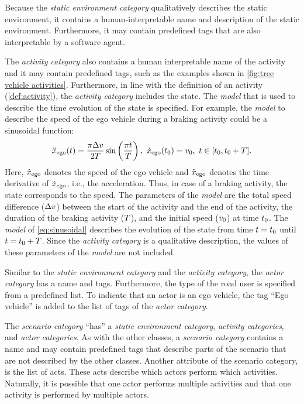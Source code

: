 \cbstartc
Because the \textit{static environment category} qualitatively describes the static environment, it contains a human-interpretable name and description of the static environment. Furthermore, it may contain predefined tags that are also interpretable by a software agent.
\cbend

\cbstart
The \textit{activity category} also contains a human interpretable name of the activity and it may contain predefined tags, such as the examples shown in \cref{fig:tree vehicle activities}. Furthermore, in line with the definition of an activity (\cref{def:activity}), the \textit{activity category} includes the state.
The \textit{model} that is used to describe the time evolution of the state is specified. For example, the \textit{model} to describe the speed of the ego vehicle during a braking activity could be a sinusoidal function:
\cbstartc
\begin{equation} \label{eq:sinusoidal}
	\ddot{x}_{\mathrm{ego}}(t) = \frac{\pi \Delta v}{2T} \sin \left( \frac{\pi t}{T} \right),\ \dot{x}_{\mathrm{ego}}(t_{0}) = v_{0},\ t \in [t_{0}, t_{0}+T].
\end{equation}
Here, $\dot{x}_{\mathrm{ego}}$ denotes the speed of the ego vehicle and $\ddot{x}_{\mathrm{ego}}$ denotes the time derivative of $\dot{x}_{\mathrm{ego}}$, i.e., the acceleration. Thus, in case of a braking activity, the state corresponds to the speed. 
The parameters of the \textit{model} are the total speed difference ($\Delta v$) between the start of the activity and the end of the activity, the duration of the braking activity ($T$), and the initial speed ($v_{0}$) at time $t_{0}$. 
\cbstart
The \textit{model} of \cref{eq:sinusoidal} describes the evolution of the state from time $t=t_{0}$ until $t=t_{0}+T$. Since the \textit{activity category} is a qualitative description, the values of these parameters of the \textit{model} are not included.
\cbend

Similar to the \textit{static environment category} and the \textit{activity category}, the \textit{actor category} has a name and tags. Furthermore, the type of the road user is specified from a predefined list. To indicate that an actor is an ego vehicle, the tag ``Ego vehicle'' is added to the list of tags of the \textit{actor category}.

The \textit{scenario category} ``has'' a \textit{static environment category}, \textit{activity categories}, and \textit{actor categories}. As with the other classes, a \textit{scenario category} contains a name and may contain predefined tags that describe parts of the scenario that are not described by the other classes.
Another attribute of the scenario category, is the list of acts. %
These acts describe which actors perform which activities. Naturally, it is possible that one actor performs multiple activities and that one activity is performed by multiple actors.


